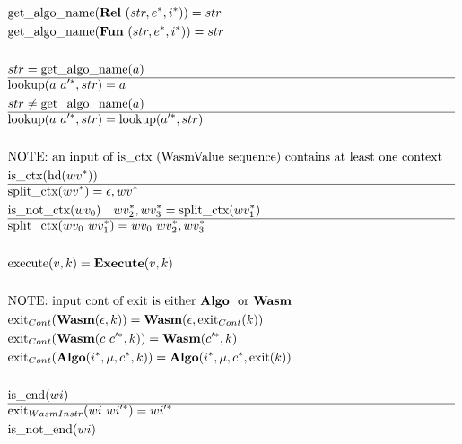 \begin{align*}
%
\newline \\
  &\getalgoname(\rel ~ (str, \seq e, \seq i)) = str \\
  &\getalgoname(\fun ~ (str, \seq e, \seq i)) = str \\
%
\newline \\
  &str = \getalgoname(a) \\
  \hline
  &\lookup(a ~ \seq{a'}, str) = a \\
%
  &str \not = \getalgoname(a) \\
  \hline
  &\lookup(a ~ \seq{a'}, str) = \lookup(\seq{a'}, str) \\
%
\newline \\
&\text{NOTE: an input of is\_ctx (WasmValue sequence) contains at least one context} \\
  &\text{is\_ctx}(\text{hd}(\seq{wv})) \\
  \hline
  &\splitctx(\seq{wv}) = \epsilon, \seq{wv} \\
  &\text{is\_not\_ctx}(wv_0) \quad \seq{wv_2}, \seq{wv_3} = \splitctx(\seq{wv_1}) \\
  \hline
  &\splitctx(wv_0 ~ \seq{wv_1}) = wv_0 ~ \seq{wv_2}, \seq{wv_3} \\
%
\newline \\
  &\execute(v, k) = \exe(v, k) \\
%
\newline \\
&\text{NOTE: input cont of exit is either \algo ~ or \wasm} \\
  &\exit_{Cont}(\wasm (\epsilon, k)) = \wasm(\epsilon, \exit_{Cont}(k)) \\
  &\exit_{Cont}(\wasm (c ~ \seq{c'}, k)) = \wasm(\seq{c'}, k) \\
  &\exit_{Cont}(\algo (\seq i, \mu, \seq c, k)) = \algo (\seq i, \mu, \seq c, \exit(k)) \\
%
\newline \\
  &\text{is\_end}(wi) \\
  \hline
  &\exit_{WasmInstr}(wi ~ \seq{wi'}) = \seq{wi'} \\
  &\text{is\_not\_end}(wi) \\

\end{align*}
